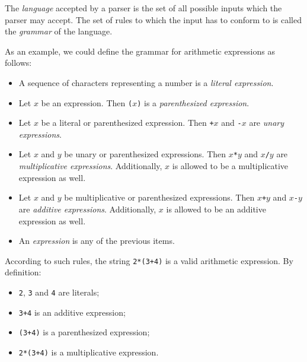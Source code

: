 \documentclass[11pt, american, draft]{PhdThesis}
\begin{document}
  The \emph{language} accepted by a parser is the set of all possible inputs which the parser may
  accept. The set of rules to which the input has to conform to is called the \emph{grammar} of the
  language.

  As an example, we could define the grammar for arithmetic expressions as follows:

  \begin{itemize}[noitemsep,topsep=0pt]
    \item A sequence of characters representing a number is a \emph{literal expression}.

    \item Let $x$ be an expression. Then \mbox{\texttt{($x$)}} is a \emph{parenthesized expression}.

    \item Let $x$ be a literal or parenthesized expression. Then \mbox{\texttt{+$x$}} and
          \mbox{\texttt{-$x$}} are \emph{unary expressions}.

    \item Let $x$ and $y$ be unary or parenthesized expressions. Then \mbox{\texttt{$x$*$y$}} and
          \mbox{\texttt{$x$/$y$}} are \emph{multiplicative expressions}. Additionally, $x$ is
          allowed to be a multiplicative expression as well.

    \item Let $x$ and $y$ be multiplicative or parenthesized expressions. Then
          \mbox{\texttt{$x$+$y$}} and \mbox{\texttt{$x$-$y$}} are \emph{additive expressions}.
          Additionally, $x$ is allowed to be an additive expression as well.

    \item An \emph{expression} is any of the previous items.
  \end{itemize}

  According to such rules, the string \verb$2*(3+4)$ is a valid arithmetic expression. By
  definition:

  \begin{itemize}[noitemsep,topsep=0pt]
    \item \verb$2$, \verb$3$ and \verb$4$ are literals;
    \item \verb$3+4$ is an additive expression;
    \item \verb$(3+4)$ is a parenthesized expression;
    \item \verb$2*(3+4)$ is a multiplicative expression.
  \end{itemize}
\end{document}
